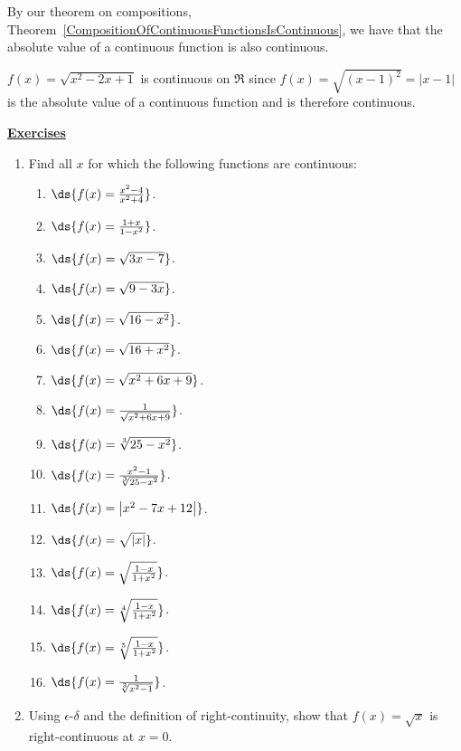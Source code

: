 By our theorem on compositions,
Theorem~\ref{CompositionOfContinuousFunctionsIsContinuous},
we have that the absolute value of a continuous function
is also continuous.


\bex
$f(x)=\sqrt{x^2-2x+1}$ is continuous on $\Re$ since
$f(x)=\sqrt{(x-1)^2}=|x-1|$ is the absolute value of 
a continuous function and is therefore continuous.
\eex










\begin{center}
\underline{\Large{\bf Exercises}}\end{center}
\bigskip
\begin{multicols}{2}
\begin{enumerate}
\item Find all $x$ for which the following functions are
continuous:
\begin{enumerate}
\item $\ds{f(x)=\frac{x^2-4}{x^2+4}}$.
\item $\ds{f(x)=\frac{1+x}{1-x^2}}$.
\item $\ds{f(x)=\sqrt{3x-7}}$.
\item $\ds{f(x)=\sqrt{9-3x}}$.
\item $\ds{f(x)=\sqrt{16-x^2}}$.
\item $\ds{f(x)=\sqrt{16+x^2}}$.
\item $\ds{f(x)=\sqrt{x^2+6x+9}}$.
\item $\ds{f(x)=\frac1{\sqrt{x^2+6x+9}}}$.
\item $\ds{f(x)=\sqrt[3]{25-x^2}}$.
\item $\ds{f(x)=\frac{x^2-1}{\sqrt[3]{25-x^2}}}$.
\item $\ds{f(x)=\left|x^2-7x+12\right|}$.
\item $\ds{f(x)=\sqrt{|x|}}$.
\item $\ds{f(x)=\sqrt{\frac{1-x}{1+x^2}}}$.
\item $\ds{f(x)=\sqrt[4]{\frac{1-x}{1+x^2}}}$.
\item $\ds{f(x)=\sqrt[5]{\frac{1-x}{1+x^2}}}$.
\item $\ds{f(x)=\frac1{\sqrt[3]{x^2-1}}}$.

\end{enumerate}
\item Using $\epsilon$-$\delta$ and the definition of 
      right-continuity, show that $f(x)=\sqrt{x}$ is right-continuous
      at $x=0$.


\end{enumerate}
\end{multicols}
